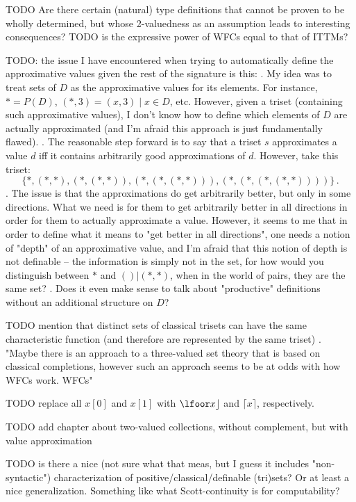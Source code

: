 \documentclass[oneside,12pt]{book}
\theoremstyle{definition}
\theoremstyle{remark}
\begin{document}
TODO Are there certain (natural) type definitions that
cannot be proven to be wholly determined, but whose 2-valuedness
as an assumption leads to interesting consequences?
TODO is the expressive power of WFCs equal to that of ITTMs?

TODO: the issue I have encountered when trying to automatically define
the approximative values given the rest of the signature is this:
.
My idea was to treat sets of $D$ as the approximative values for its elements.
For instance, $* = P(D)$, $(*, 3) = { (x, 3) \mid x \in D }$, etc. However,
given a triset (containing such approximative values), I don't know how
to define which elements of $D$ are actually approximated (and I'm afraid
this approach is just fundamentally flawed).
.
The reasonable step forward is to say that a triset $s$ approximates a value $d$
iff it contains arbitrarily good approximations of $d$. However, take this
triset: \[\{ *, (*, *), (*, (*, *)), (*, (*, (*, *))), (*, (*, (*, (*, *)))) \}\,.\]
.
The issue is that the approximations do get arbitrarily better, but only in
some directions. What we need is for them to get arbitrarily better in all
directions in order for them to actually approximate a value. However, it
seems to me that in order to define what it means to "get better in all
directions", one needs a notion of "depth" of an approximative value, and I'm
afraid that this notion of depth is not definable -- the information
is simply not in the set, for how would you distinguish between $*$ and
$() | (*, *)$, when in the world of pairs, they are the same set?
.
Does it even make sense to talk about "productive" definitions without
an additional structure on $D$?

TODO mention that distinct sets of classical trisets can have the same characteristic
function (and therefore are represented by the same triset)
.
"Maybe there is an approach to a three-valued set theory that is based on classical
completions, however such an approach seems to be at odds with how WFCs work.
WFCs"

TODO replace all $x[0]$ and $x[1]$ with $\lfoor x \rfloor$ and $\lceil x \rceil$, respectively.

TODO add chapter about two-valued collections, without complement, but with value
approximation

TODO is there a nice (not sure what that meas, but I guess it includes "non-syntactic")
characterization of positive/classical/definable (tri)sets? Or at least a nice generalization.
Something like what Scott-continuity is for computability?
\end{document}
